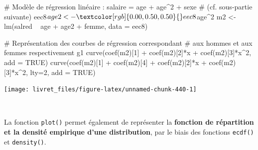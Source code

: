 \documentclass[12pt,twosided, notitlepage]{book}
\newenvironment{Shaded}{}{}
\newcommand{\KeywordTok}[1]{\textcolor[rgb]{0.00,0.00,1.00}{#1}}
\newcommand{\DataTypeTok}[1]{#1}
\newcommand{\DecValTok}[1]{#1}
\newcommand{\StringTok}[1]{\textcolor[rgb]{0.00,0.50,0.50}{#1}}
\newcommand{\CommentTok}[1]{\textcolor[rgb]{0.00,0.50,0.00}{#1}}
\newcommand{\OtherTok}[1]{\textcolor[rgb]{1.00,0.25,0.00}{#1}}
\newcommand{\OperatorTok}[1]{#1}
\newcommand{\NormalTok}[1]{#1}
\renewenvironment{Shaded}{\begin{snugshade}}{\end{snugshade}}
\begin{document}
\begin{Shaded}
\begin{Highlighting}[]
\CommentTok{# Modèle de régression linéaire : salaire = age + age^2 + sexe}
\CommentTok{# (cf. sous-partie suivante)}
\NormalTok{eec8}\OperatorTok{$}\NormalTok{age2 <-}\StringTok{ }\NormalTok{eec8}\OperatorTok{$}\NormalTok{age}\OperatorTok{^}\DecValTok{2}
\NormalTok{m2 <-}\StringTok{ }\KeywordTok{lm}\NormalTok{(salred }\OperatorTok{~}\StringTok{ }\NormalTok{age }\OperatorTok{+}\StringTok{ }\NormalTok{age2 }\OperatorTok{+}\StringTok{ }\NormalTok{femme, }\DataTypeTok{data =}\NormalTok{ eec8)}

\CommentTok{# Représentation des courbes de régression correspondant}
\CommentTok{# aux hommes et aux femmes respectivement}
\NormalTok{g1}
\KeywordTok{curve}\NormalTok{(}\KeywordTok{coef}\NormalTok{(m2)[}\DecValTok{1}\NormalTok{] }\OperatorTok{+}\StringTok{ }\KeywordTok{coef}\NormalTok{(m2)[}\DecValTok{2}\NormalTok{]}\OperatorTok{*}\NormalTok{x }\OperatorTok{+}\StringTok{ }\KeywordTok{coef}\NormalTok{(m2)[}\DecValTok{3}\NormalTok{]}\OperatorTok{*}\NormalTok{x}\OperatorTok{^}\DecValTok{2}\NormalTok{, }\DataTypeTok{add =} \OtherTok{TRUE}\NormalTok{)}
\KeywordTok{curve}\NormalTok{(}\KeywordTok{coef}\NormalTok{(m2)[}\DecValTok{1}\NormalTok{] }\OperatorTok{+}\StringTok{ }\KeywordTok{coef}\NormalTok{(m2)[}\DecValTok{4}\NormalTok{] }\OperatorTok{+}\StringTok{ }\KeywordTok{coef}\NormalTok{(m2)[}\DecValTok{2}\NormalTok{]}\OperatorTok{*}\NormalTok{x }\OperatorTok{+}\StringTok{ }\KeywordTok{coef}\NormalTok{(m2)[}\DecValTok{3}\NormalTok{]}\OperatorTok{*}\NormalTok{x}\OperatorTok{^}\DecValTok{2}\NormalTok{, }\DataTypeTok{lty=}\DecValTok{2}\NormalTok{, }\DataTypeTok{add =} \OtherTok{TRUE}\NormalTok{)}
\end{Highlighting}
\end{Shaded}

\begin{center}\texttt{[image: livret\_files/figure-latex/unnamed-chunk-440-1]} \end{center}

~

La fonction \texttt{plot()} permet également de
représenter la \textbf{fonction de répartition et la densité empirique
d'une distribution}, par le biais des fonctions
\texttt{ecdf()} et
\texttt{density()}.

\begin{Shaded}
\end{Shaded}
\end{document}

